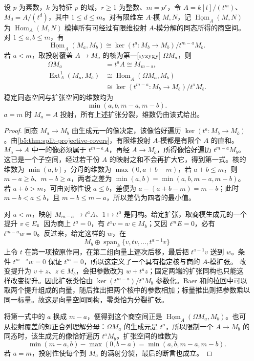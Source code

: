 \begin{proposition}\label{b5:prop:cyclic-stable-hom-extensions}
	设 \(p\) 为素数，\(k\) 为特征 \(p\) 的域，\(r\ge1\) 为整数、\(m=p^r\)，令 \(A=k[t]/(t^m)\)、\(M_d=A/(t^d)\)，其中 \(1\le d\le m\)。对有限维左 \(A\)-模 \(M,N\)，记 \(\underline{\operatorname{Hom}}_A(M,N)\) 为 \(\operatorname{Hom}_A(M,N)\) 模掉所有可经过有限维投射 \(A\)-模分解的同态所得的商空间。对 \(1\le a,b\le m\)，有
	\[
		\underline{\operatorname{Hom}}_A(M_a,M_b) \cong\ker(t^a:M_b\to M_b)/t^{m-a}M_b.
	\]
	若 \(a<m\)，取投射覆盖 \(A\to M_a\) 的核为第一[syzygy] \(\Omega M_a\)，则
	\[
		\begin{aligned}
			\Omega M_a&=t^aA\cong M_{m-a},\\
			\operatorname{Ext}_A^1(M_a,M_b) &\cong\underline{\operatorname{Hom}}_A(\Omega M_a,M_b)\\
			&\cong\ker(t^{m-a}:M_b\to M_b)/t^aM_b.
		\end{aligned}
	\]
	稳定同态空间与扩张空间的维数均为
	\[
		\min(a,b,m-a,m-b).
	\]
	\(a=m\) 时 \(M_a=A\) 投射，所有上述扩张分裂，维数仍由该式给出。
\end{proposition}
\begin{proof}
	同态 \(M_a\to M_b\) 由生成元一的像决定，该像恰好遍历 \(\ker(t^a:M_b\to M_b)\)。由\cref{b5:thm:split-projective-covers}，有限维投射 \(A\)-模都是有限个 \(A\) 的直和。\(M_a\to A\) 中一的像必须属于 \(t^{m-a}A\)，再经 \(A\to M_b\)，所得像恰好遍历 \(t^{m-a}M_b\)。这已是一个子空间，经过若干份 \(A\) 的映射之和不会再扩大它，得到第一式。核的维数为 \(\min(a,b)\)，分母的维数为 \(\max(0,a+b-m)\)，若 \(a+b\le m\)，则 \(m-a\ge b\)、\(m-b\ge a\)，两者之差为 \(\min(a,b)=\min(a,b,m-a,m-b)\)。若 \(a+b>m\)，可由对称性设 \(a\le b\)，差便为 \(a-(a+b-m)=m-b\)；此时 \(m-b<a\le b\)，且 \(m-b\le m-a\)，所以差仍为四者的最小值。

	对 \(a<m\)，映射 \(M_{m-a}\to t^aA\)、\(1\mapsto t^a\) 是同构。给定扩张，取商模生成元的一个提升 \(v\in E\)。因为商上 \(t^a=0\)，有 \(t^av=w\in M_b\)；又因 \(t^mE=0\)，必有 \(t^{m-a}w=0\)。反过来，给定这样的 \(w\)，在
	\[
		M_b\oplus\operatorname{span}_k\{v,tv,\ldots,t^{a-1}v\}
	\]
	上令 \(t\) 在第一项按原作用，在第二组向量上逐次后移，最后把 \(t^{a-1}v\) 送到 \(w\)。条件 \(t^{m-a}w=0\) 保证 \(t^m=0\)，所以这定义了一个具有指定核与商的 \(A\)-模扩张。 改变提升为 \(v+z\)、\(z\in M_b\)，会把参数改为 \(w+t^az\)；固定两端的扩张同构也只能这样改变提升。因此扩张类恰由 \(\ker(t^{m-a})/t^aM_b\) 参数化。Baer 和的拉回中可以取两个提升组成的向量，随后推出把两个核中的参数相加；标量推出则把参数乘以同一标量。故这是向量空间同构，零类恰为分裂扩张。

	将第一式中的 \(a\) 换成 \(m-a\)，便得到这个商空间正是 \(\underline{\operatorname{Hom}}_A(\Omega M_a,M_b)\)。也可从投射覆盖的短正合列理解分母：\(\Omega M_a\) 的生成元是 \(t^a\)，所以限制一个 \(A\to M_b\) 的同态时，该生成元的像恰好遍历 \(t^aM_b\)。扩张空间的维数为
	\[
		\min(m-a,b)-\max(0,b-a)=\min(a,b,m-a,m-b).
	\]
	若 \(a=m\)，投射性使每个到 \(M_a\) 的满射分裂，最后的断言也成立。
\end{proof}
